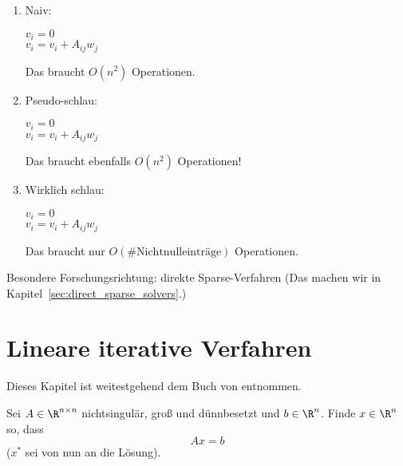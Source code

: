 \begin{enumerate}
 \item Naiv:\\
  \begin{algorithm}[H]
   \SetAlgoLined
   {
     $v_i = 0$\\
     {
       $v_i = v_i + A_{ij} w_j$
     }
   }
  \end{algorithm}

  Das braucht $O(n^2)$ Operationen.

 \item Pseudo-schlau:\\
  \begin{algorithm}[H]
   \SetAlgoLined
   {
     $v_i = 0$\\
     {
       {
         $v_i = v_i + A_{ij} w_j$
       }
     }
   }
  \end{algorithm}
  Das braucht ebenfalls $O(n^2)$ Operationen!

 \item Wirklich schlau: \\
  \begin{algorithm}[H]
   \SetAlgoLined
   {
     $v_i = 0$\\
     {
       $v_i = v_i + A_{ij} w_j$
     }
   }
  \end{algorithm}
  Das braucht nur $O(\# \text{Nichtnulleinträge})$ Operationen.



\end{enumerate}

Besondere Forschungsrichtung: direkte Sparse-Verfahren (Das machen wir in Kapitel~\ref{sec:direct_sparse_solvers}.)


\section{Lineare iterative Verfahren}

Dieses Kapitel ist weitestgehend dem Buch von \citet{dahmen_reusken:2008} entnommen.

\bigskip

Sei $A \in \R^{n \times n}$ nichtsingulär, groß und dünnbesetzt und $b \in \R^n$. Finde $x \in \R^n$ so,
dass
\begin{equation*}
Ax=b
\end{equation*}
($x^*$ sei von nun an die Lösung).


